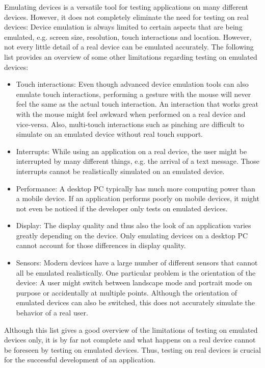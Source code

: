 Emulating devices is a versatile tool for testing applications on many different devices. However, it does not completely eliminate the need for testing on real devices: Device emulation is always limited to certain aspects that are being emulated, e.g. screen size, resolution, touch interactions and location. However, not every little detail of a real device can be emulated accurately. The following list provides an overview of some other limitations regarding testing on emulated devices:
\begin{itemize}
	\item Touch interactions: Even though advanced device emulation tools can also emulate touch interactions, performing a gesture with the mouse will never feel the same as the actual touch interaction. An interaction that works great with the mouse might feel awkward when performed on a real device and vice-versa. Also, multi-touch interactions such as pinching are difficult to simulate on an emulated device without real touch support.
	\item Interrupts: While using an application on a real device, the user might be interrupted by many different things, e.g. the arrival of a text message. Those interrupts cannot be realistically simulated on an emulated device.
	\item Performance: A desktop PC typically has much more computing power than a mobile device. If an application performs poorly on mobile devices, it might not even be noticed if the developer only tests on emulated devices.
	\item Display: The display quality and thus also the look of an application varies greatly depending on the device. Only emulating devices on a desktop PC cannot account for those differences in display quality. 
	\item Sensors: Modern devices have a large number of different sensors that cannot all be emulated realistically. One particular problem is the orientation of the device: A user might switch between landscape mode and portrait mode on purpose or accidentally at multiple points. Although the orientation of emulated devices can also be switched, this does not accurately simulate the behavior of a real user.
\end{itemize}
Although this list gives a good overview of the limitations of testing on emulated devices only, it is by far not complete and what happens on a real device cannot be foreseen by testing on emulated devices. Thus, testing on real devices is crucial for the successful development of an application. 

